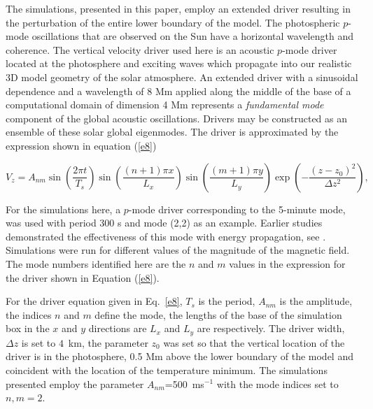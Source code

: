 \documentclass[physics,article,submit,pdftex,moreauthors]{Definitions/mdpi}
\begin{document}
The simulations, presented in this paper, employ an extended driver resulting in the perturbation of the entire lower boundary of the model.  The photospheric $p$-mode oscillations  that are observed on the Sun have a horizontal wavelength and coherence. The vertical velocity driver used here is an acoustic $p$-mode driver located at the photosphere and exciting waves which propagate into our realistic 3D model geometry of the solar atmosphere. An extended driver with a sinusoidal dependence and a wavelength of 8 Mm applied along the middle of the base of a computational domain of dimension 4 Mm represents  a {\it fundamental mode}  component of the global acoustic oscillations. Drivers may be constructed as an ensemble of these solar global eigenmodes. The driver is approximated by the expression shown in equation (\ref{e8}) 


\begin{equation}
 V_{z}  =  A_{nm} \sin\left(\frac{2\pi t}{T_s} \right)\sin\left(  \frac{(n+1)\pi x}{L_x} \right)  
 \sin\left(\frac{(m+1)\pi y}{L_y} \right) \exp\left( -\frac{(z-z_0)^2}{\Delta z^2} \right),
\label{e8}
\end{equation}

For the  simulations here, a $p$-mode driver corresponding to the 5-minute mode, was used with period 300 s and mode (2,2) as an example. Earlier studies demonstrated the effectiveness of this mode with energy propagation, see \cite{Griffiths2018b}. Simulations were run for different values of the magnitude of the magnetic field. The mode numbers identified here are the $n$ and $m$ values in the expression for the driver shown in Equation (\ref{e8}).











For the driver equation given in Eq.~\ref{e8}, $T_{s}$ is the period, $A_{nm}$ is the amplitude, the indices $n$ and $m$ define the mode, the lengths of the base of the simulation box in the $x$ and $y$ directions are $L_{x}$ and $L_{y}$ are  respectively. The driver width, $\Delta z$ is set to $4$~km, the parameter $z_{0}$ was set so that the vertical location of the driver is in the photosphere, 0.5 Mm above the lower boundary of the model and coincident with the location of the temperature minimum. The simulations presented employ the parameter $A_{nm}$=500\, ms$^{-1}$ with the mode indices set to $n,m=2$. 
\end{document}
